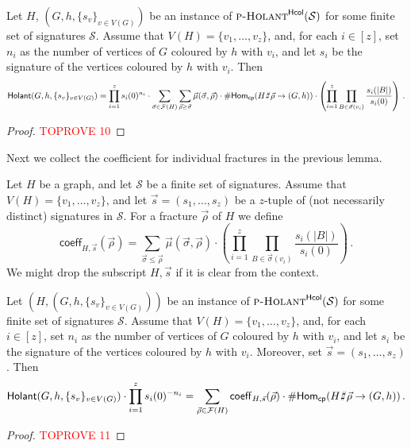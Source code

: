 \documentclass[authorcolumns,numberwithinsect]{no-lipics-v2022}
\def\fracture#1#2{\ensuremath{#1\raisebox{.2ex}{\rotatebox[origin=c]{-15}{$\sharp$}}#2}}
\newcommand{\holantprobstar}{\text{\sc{p-Holant}}^{\mathsf{Hcol}}}
\newcommand{\homscp}{\mathsf{Hom}_{\mathsf{cp}}}
\newcommand{\holant}{\mathsf{Holant}}
\def\fracture#1#2{\ensuremath{#1\raisebox{.2ex}{\rotatebox[origin=c]{-15}{$\sharp$}}#2}}
\begin{document}
\begin{lemma}\label{lem:holant_star_to_cphoms}
    Let $H$, $(G,h,\{s_v\}_{v\in V(G)})$ be an instance of $\holantprobstar(\mathcal{S})$ for some finite set of signatures $\mathcal{S}$. Assume that $V(H)=\{v_1,\dots,v_z\}$, and, for each $i\in [z]$, set $n_i$ as the number of vertices of $G$ coloured by $h$ with $v_i$, and let $s_i$ be the signature of the vertices coloured by $h$ with $v_i$. 
    Then
    \[ \holant(G,h,\{s_v\}_{v\in V(G)}) = \prod_{i=1}^z s_i(0)^{n_i} \cdot \sum_{\vec{\sigma}\in \mathcal{F}(H)} \sum_{\vec{\rho} \geq \vec{\sigma}} \vec{\mu}(\vec{\sigma},\vec{\rho}) \cdot \#\homscp(\fracture{H}{\vec{\rho}} \to (G,h)) \cdot \left(\prod_{i=1}^z \prod_{B \in \vec{\sigma}(v_i)} \frac{s_i(|B|)}{s_i(0)}  \right) \,.\]
\end{lemma}
\begin{proof}\textcolor{red}{TOPROVE 10}\end{proof}

Next we collect the coefficient for individual fractures in the previous lemma. 

\begin{definition}
   Let $H$ be a graph, and let $\mathcal{S}$ be a finite set of signatures. Assume that $V(H)=\{v_1,\dots,v_z\}$, and let $\vec{s}=(s_1,\dots,s_z)$ be a $z$-tuple of (not necessarily distinct) signatures in $\mathcal{S}$. For a fracture $\vec{\rho}$ of $H$ we define
   \[ \mathsf{coeff}_{H,\vec{s}}(\vec{\rho})= \sum_{\vec{\sigma} \leq \vec{\rho}} \vec{\mu}(\vec{\sigma},\vec{\rho}) \cdot \left(\prod_{i=1}^z \prod_{B \in \vec{\sigma}(v_i)} \frac{s_i(|B|)}{s_i(0)}  \right) \,.\]
   We might drop the subscript $H,\vec{s}$ if it is clear from the context.
\end{definition}

\begin{corollary}\label{cor:collect_coeffs}
    Let $(H,(G,h,\{s_v\}_{v\in V(G)}))$ be an instance of $\holantprobstar(\mathcal{S})$ for some finite set of signatures $\mathcal{S}$. Assume that $V(H)=\{v_1,\dots,v_z\}$, and, for each $i\in [z]$, set $n_i$ as the number of vertices of $G$ coloured by $h$ with $v_i$, and let $s_i$ be the signature of the vertices coloured by $h$ with $v_i$. Moreover, set $\vec{s}=(s_1,\dots,s_z)$.
    Then
    \[ \holant(G,h,\{s_v\}_{v\in V(G)}) \cdot \prod_{i=1}^z s_i(0)^{-n_i} = \sum_{\vec{\rho}\in \mathcal{F}(H)} \mathsf{coeff}_{H,\vec{s}}(\vec{\rho})  \cdot \#\homscp(\fracture{H}{\vec{\rho}} \to (G,h))  \,.\]
\end{corollary}
\begin{proof}\textcolor{red}{TOPROVE 11}\end{proof}
\end{document}
